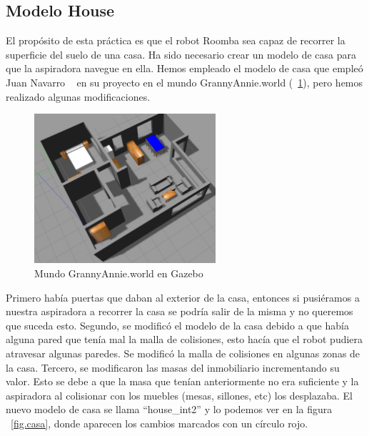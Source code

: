 \subsection{Modelo House}
El propósito de esta práctica es que el robot Roomba sea capaz de recorrer la superficie del suelo de una casa. Ha sido necesario crear un modelo de casa para que la aspiradora navegue en ella. Hemos empleado el modelo de casa que empleó Juan Navarro ~\cite{localization1} en su proyecto en el mundo GrannyAnnie.world (~\ref{fig.modelocasa_antiguo}), pero hemos realizado algunas modificaciones.\\

\begin{figure}[H]
  \begin{center}
    \includegraphics[width=0.6\textwidth]{figures/Vacuum/ModeloCasa_antiguo.png}
		\caption{Mundo GrannyAnnie.world en Gazebo}
		\label{fig.modelocasa_antiguo}
		\end{center}
\end{figure}

Primero había puertas que daban al exterior de la casa, entonces si pusiéramos a nuestra aspiradora a recorrer la casa se podría salir de la misma y no queremos que suceda esto. Segundo, se modificó el modelo de la casa debido a que había alguna pared que tenía mal la malla de colisiones, esto hacía que el robot pudiera atravesar algunas paredes. Se modificó la malla de colisiones en algunas zonas de la casa. Tercero, se modificaron las masas del inmobiliario incrementando su valor. Esto se debe a que la masa que tenían anteriormente no era suficiente y la aspiradora al colisionar con los muebles (mesas, sillones, etc) los desplazaba. El nuevo modelo de casa se llama ``house\_int2'' y lo podemos ver en la figura ~\ref{fig.casa}, donde aparecen los cambios marcados con un círculo rojo.\\

